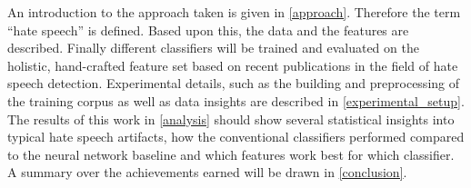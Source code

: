 An introduction to the approach taken is given in \autoref{approach}. Therefore the term \enquote{hate speech} is defined. Based upon this, the data and the features are described. Finally different classifiers will be trained and evaluated on the holistic, hand-crafted feature set based on recent pub\-li\-ca\-tions in the field of hate speech detection. 
Experimental details, such as the building and pre\-pro\-cess\-ing of the training corpus as well as data insights are described in \autoref{experimental_setup}. The results of this work in \autoref{analysis} should show several statistical insights into typical hate speech artifacts, how the conventional classifiers performed compared to the neural network baseline and which features work best for which classifier. A summary over the achievements earned will be drawn in \autoref{conclusion}.
